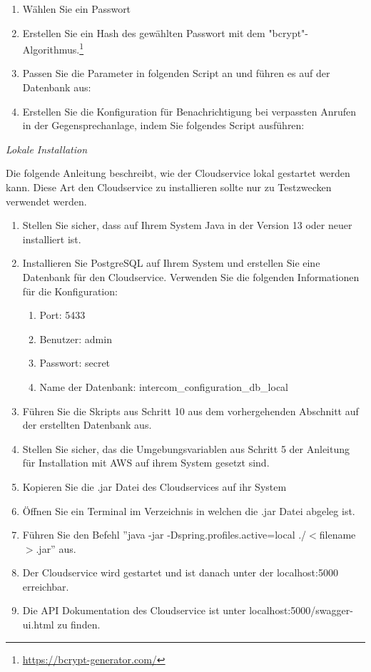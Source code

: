 \begin{enumerate}
\begin{enumerate}
        \item Wählen Sie ein Passwort
        \item Erstellen Sie ein Hash des gewählten Passwort mit dem "bcrypt"-Algorithmus.\footnote{\url{https://bcrypt-generator.com/}}
        \item Passen Sie die Parameter in folgenden Script an und führen es auf der Datenbank aus:
        
        \item Erstellen Sie die Konfiguration für Benachrichtigung bei verpassten Anrufen in der Gegensprechanlage, indem Sie folgendes Script ausführen:
        
    \end{enumerate}

\end{enumerate}

\clearpage

\textit{Lokale Installation}

Die folgende Anleitung beschreibt, wie der Cloudservice lokal gestartet werden kann.
Diese Art den Cloudservice zu installieren sollte nur zu Testzwecken verwendet werden.

\begin{enumerate}
    \item Stellen Sie sicher, dass auf Ihrem System Java in der Version 13 oder neuer installiert ist.
    \item Installieren Sie PostgreSQL auf Ihrem System und erstellen Sie eine Datenbank für den Cloudservice.
    Verwenden Sie die folgenden Informationen für die Konfiguration: 
    \begin{enumerate}
        \item Port: 5433
        \item Benutzer: admin
        \item Passwort: secret
        \item Name der Datenbank: intercom\_configuration\_db\_local
    \end{enumerate}
    \item Führen Sie die Skripts aus Schritt 10 aus dem vorhergehenden Abschnitt auf der erstellten Datenbank aus.
    \item Stellen Sie sicher, das die Umgebungsvariablen aus Schritt 5 der Anleitung für Installation mit AWS auf ihrem System gesetzt sind.
    \item Kopieren Sie die .jar Datei des Cloudservices auf ihr System
    \item Öffnen Sie ein Terminal im Verzeichnis in welchen die .jar Datei abgeleg ist.
    \item Führen Sie den Befehl ''java -jar -Dspring.profiles.active=local ./$<$filename$>$.jar'' aus.
    \item Der Cloudservice wird gestartet und ist danach unter der localhost:5000 erreichbar.
    \item Die API Dokumentation des Cloudservice ist unter localhost:5000/swagger-ui.html zu finden.
\end{enumerate}


